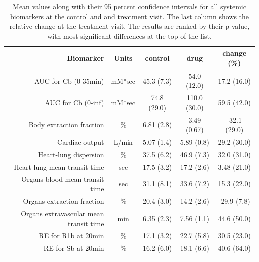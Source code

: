 \documentclass{epflreport}%
\begin{document}
\begin{longtable}{rcccc}%
\hline%
Biomarker&Units&control&drug&change (\%)\\%
\hline%
AUC for Cb (0{-}35min)&mM*sec&45.3 (7.3) &54.0 (12.0) &17.2 (16.0) \\%
AUC for Cb (0{-}inf)&mM*sec&74.8 (29.0) &110.0 (30.0) &59.5 (42.0) \\%
Body extraction fraction&\%&6.81 (2.8) &3.49 (0.67) &{-}32.1 (29.0) \\%
Cardiac output&L/min&5.07 (1.4) &5.89 (0.8) &29.2 (30.0) \\%
Heart{-}lung dispersion&\%&37.5 (6.2) &46.9 (7.3) &32.0 (31.0) \\%
Heart{-}lung mean transit time&sec&17.5 (3.2) &17.2 (2.6) &3.48 (21.0) \\%
Organs blood mean transit time&sec&31.1 (8.1) &33.6 (7.2) &15.3 (22.0) \\%
Organs extraction fraction&\%&20.4 (3.0) &14.2 (2.6) &{-}29.9 (7.8) \\%
Organs extravascular mean transit time&min&6.35 (2.3) &7.56 (1.1) &44.6 (50.0) \\%
RE for R1b at 20min&\%&17.1 (3.2) &22.7 (5.8) &30.5 (23.0) \\%
RE for Sb at 20min&\%&16.2 (6.0) &18.1 (6.6) &40.6 (64.0) \\%
\hline%
\caption{Mean values along with their 95 percent confidence intervals for all systemic biomarkers at the control and and treatment visit. The last column shows the relative change at the treatment visit. The results are ranked by their p-value, with most significant differences at the top of the list.} \\%
\end{longtable}%
\end{document}
